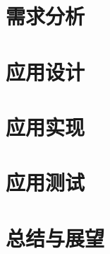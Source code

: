 \documentclass{ecnuthesis}
\begin{document}
    \chapter{需求分析}\label{ch:requirement}


    \chapter{应用设计}\label{ch:design}


    \chapter{应用实现}\label{ch:implement}


    \chapter{应用测试}\label{ch:test}


    \chapter{总结与展望}\label{ch:conclusion}


    \backmatter
    \PrintReference

    \begin{appendix}
    \end{appendix}

    \begin{acknowledgement}
    \end{acknowledgement}
\end{document}
